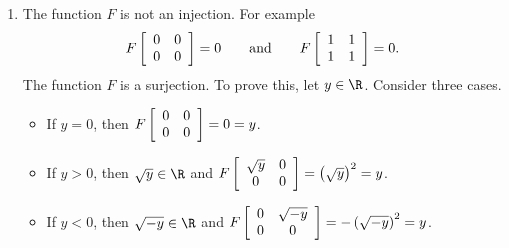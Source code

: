 \documentclass[11pt]{article}
\begin{document}
\begin{enumerate}
\item The function $F$ is not an injection.  For example
\[
F \left[ {\begin{array}{*{20}c}
   0 & 0  \\
   0 & 0  \\
\end{array} } \right] =  0 \qquad \text{and} \qquad
F \left[ {\begin{array}{*{20}c}
   1 & 1  \\
   1 & 1  \\
\end{array} } \right] =  0.
\]
The function $F$ is a surjection.  To prove this, let $y \in \R$.  Consider three cases.
\begin{itemize}
\item If $y = 0$, then $F \left[ {\begin{array}{*{20}c}
   0 & 0  \\
   0 & 0  \\
\end{array} } \right] =  0 = y$.

\item If $y > 0$, then $\sqrt{y} \in \R$ and $F \left[ {\begin{array}{*{20}c}
   \sqrt{y} & 0  \\
   0 & 0  \\
\end{array} } \right] =  \left( \sqrt{y} \right)^2 = y$.

\item If $y < 0$, then $\sqrt{-y} \in \R$ and $F \left[ {\begin{array}{*{20}c}
   0 & \sqrt{-y}  \\
   0 & 0  \\
\end{array} } \right] =  -\left( \sqrt{-y} \right)^2 = y$.

\end{itemize}

\end{enumerate}
\end{document}

